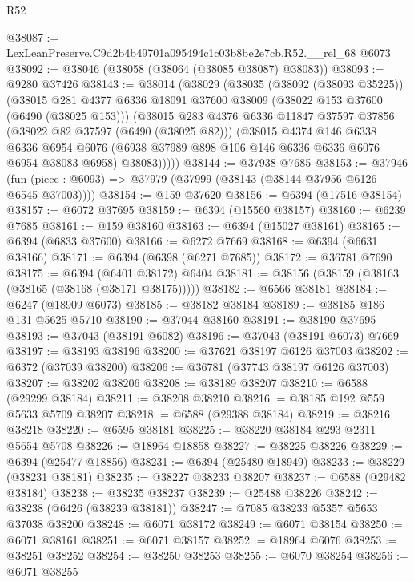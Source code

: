\begin{lexlean}{R52}
\begin{coremodule}
@38087 := LexLeanPreserve.C9d2b4b49701a095494c1c03b8be2e7cb.R52.__rel_68 @6073
@38092 := @38046 (@38058 (@38064 (@38085 @38087) @38083))
@38093 := @9280 @37426
@38143 := @38014
    (@38029
      (@38035
        (@38092 (@38093 @35225))
        (@38015
          @281
          @4377
          @6336
          @18091
          @37600
          @38009
          (@38022 @153 @37600 (@6490 (@38025 @153)))
          (@38015
            @283
            @4376
            @6336
            @11847
            @37597
            @37856
            (@38022 @82 @37597 (@6490 (@38025 @82)))
            (@38015
              @4374
              @146
              @6338
              @6336
              @6954
              @6076
              (@6938 @37989 @898 @106 @146 @6336 @6336 @6076 @6954 @38083 @6958)
              @38083)))))
@38144 := @37938 @7685
@38153 := @37946
    (fun (piece : @6093) => @37979 (@37999 (@38143 (@38144 @37956 @6126 @6545 @37003))))
@38154 := @159 @37620
@38156 := @6394 (@17516 @38154)
@38157 := @6072 @37695
@38159 := @6394 (@15560 @38157)
@38160 := @6239 @7685
@38161 := @159 @38160
@38163 := @6394 (@15027 @38161)
@38165 := @6394 (@6833 @37600)
@38166 := @6272 @7669
@38168 := @6394 (@6631 @38166)
@38171 := @6394 (@6398 (@6271 @7685))
@38172 := @36781 @7690
@38175 := @6394 (@6401 @38172) @6404
@38181 := @38156 (@38159 (@38163 (@38165 (@38168 (@38171 @38175)))))
@38182 := @6566 @38181
@38184 := @6247 (@18909 @6073)
@38185 := @38182 @38184
@38189 := @38185 @186 @131 @5625 @5710
@38190 := @37044 @38160
@38191 := @38190 @37695
@38193 := @37043 (@38191 @6082)
@38196 := @37043 (@38191 @6073) @7669
@38197 := @38193 @38196
@38200 := @37621 @38197 @6126 @37003
@38202 := @6372 (@37039 @38200)
@38206 := @36781 (@37743 @38197 @6126 @37003)
@38207 := @38202 @38206
@38208 := @38189 @38207
@38210 := @6588 (@29299 @38184)
@38211 := @38208 @38210
@38216 := @38185 @192 @559 @5633 @5709 @38207
@38218 := @6588 (@29388 @38184)
@38219 := @38216 @38218
@38220 := @6595 @38181
@38225 := @38220 @38184 @293 @2311 @5654 @5708
@38226 := @18964 @18858
@38227 := @38225 @38226
@38229 := @6394 (@25477 @18856)
@38231 := @6394 (@25480 @18949)
@38233 := @38229 (@38231 @38181)
@38235 := @38227 @38233 @38207
@38237 := @6588 (@29482 @38184)
@38238 := @38235 @38237
@38239 := @25488 @38226
@38242 := @38238 (@6426 (@38239 @38181))
@38247 := @7085 @38233 @5357 @5653 @37038 @38200
@38248 := @6071 @38172
@38249 := @6071 @38154
@38250 := @6071 @38161
@38251 := @6071 @38157
@38252 := @18964 @6076
@38253 := @38251 @38252
@38254 := @38250 @38253
@38255 := @6070 @38254
@38256 := @6071 @38255

\end{coremodule}
\end{lexlean}
